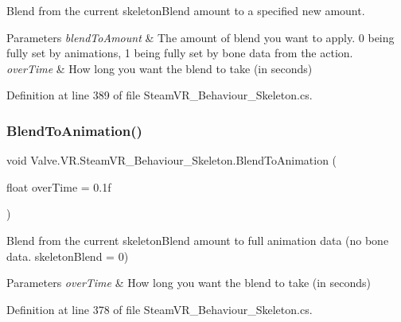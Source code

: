 Blend from the current skeleton\+Blend amount to a specified new amount. 


\begin{DoxyParams}{Parameters}
{\em blend\+To\+Amount} & The amount of blend you want to apply. 0 being fully set by animations, 1 being fully set by bone data from the action.\\
\hline
{\em over\+Time} & How long you want the blend to take (in seconds)\\
\hline
\end{DoxyParams}


Definition at line 389 of file Steam\+V\+R\+\_\+\+Behaviour\+\_\+\+Skeleton.\+cs.

\mbox{\label{class_valve_1_1_v_r_1_1_steam_v_r___behaviour___skeleton_a441a05ea1040c75c0bf3ee3a62062833}} 
\subsubsection{\texorpdfstring{BlendToAnimation()}{BlendToAnimation()}}
{\footnotesize\ttfamily void Valve.\+V\+R.\+Steam\+V\+R\+\_\+\+Behaviour\+\_\+\+Skeleton.\+Blend\+To\+Animation (\begin{DoxyParamCaption}\item[{float}]{over\+Time = {\ttfamily 0.1f} }\end{DoxyParamCaption})}



Blend from the current skeleton\+Blend amount to full animation data (no bone data. skeleton\+Blend = 0) 


\begin{DoxyParams}{Parameters}
{\em over\+Time} & How long you want the blend to take (in seconds)\\
\hline
\end{DoxyParams}


Definition at line 378 of file Steam\+V\+R\+\_\+\+Behaviour\+\_\+\+Skeleton.\+cs.

\mbox{\label{class_valve_1_1_v_r_1_1_steam_v_r___behaviour___skeleton_a7cad4650f70ac4fe81acdf6800a33392}} 
